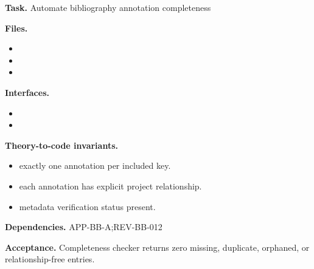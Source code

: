 \begin{statusbox}[CODE-BB-016]
\textbf{Task.} Automate bibliography annotation completeness\par
\textbf{Files.}
\begin{itemize}[leftmargin=1.7em,itemsep=1.5pt,topsep=2pt]
\item {}
\item {}
\item {}
\end{itemize}
\textbf{Interfaces.}
\begin{itemize}[leftmargin=1.7em,itemsep=1.5pt,topsep=2pt]
\item {}
\item {}
\end{itemize}
\textbf{Theory-to-code invariants.}
\begin{itemize}[leftmargin=1.7em,itemsep=1.5pt,topsep=2pt]
\item exactly one annotation per included key.
\item each annotation has explicit project relationship.
\item metadata verification status present.
\end{itemize}
\textbf{Dependencies.} APP-BB-A;REV-BB-012\par
\textbf{Acceptance.} Completeness checker returns zero missing, duplicate, orphaned, or relationship-free entries.
\end{statusbox}

